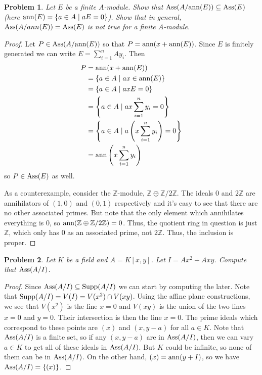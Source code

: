 \documentclass{article}
\newcommand{\ass}{\textup{Ass}}
\newcommand{\supp}{\textup{Supp}}
\newcommand{\ann}{\textup{ann}}
\newtheorem{problem}{Problem}
\begin{document}
\begin{problem}
Let $E$ be a finite $A$-module. Show that $\ass(A/\ann(E)) \subseteq \ass(E)$ (here $\ann(E) = \{a \in A \mid aE = 0\}$). Show that in general, $\ass(A/ann(E)) = \ass(E)$ is not true for a finite $A$-module.
\end{problem}
\begin{proof}
Let $P \in \ass(A/\ann(E))$ so that $P = \ann(x + \ann(E))$. Since $E$ is finitely generated we can write $E = \sum_{i=1}^n Ay_i$. Then
\begin{align*}
P
&= \ann(x + \ann(E))\\
&= \{a \in A \mid ax \in \ann(E)\}\\
&= \{a \in A \mid axE = 0\}\\
&= \left \{a \in A \mid ax\sum_{i=1}^n y_i = 0 \right \}\\
&= \left \{a \in A \mid a \left ( x \sum_{i=1}^n y_i \right ) = 0 \right \}\\
&= \ann \left ( x\sum_{i=1}^n y_i \right )
\end{align*}
so $P \in \ass(E)$ as well.

As a counterexample, consider the $\mathbb{Z}$-module, $\mathbb{Z} \oplus \mathbb{Z}/2\mathbb{Z}$. The ideals $0$ and $2 \mathbb{Z}$ are annihilators of $(1,0)$ and $(0,1)$ respectively and it's easy to see that there are no other associated primes. But note that the only element which annihilates everything is $0$, so $\ann(\mathbb{Z} \oplus \mathbb{Z}/2\mathbb{Z}) = 0$. Thus, the quotient ring in question is just $\mathbb{Z}$, which only has $0$ as an associated prime, not $2 \mathbb{Z}$. Thus, the inclusion is proper.
\end{proof}

\begin{problem}
Let $K$ be a field and $A = K[x,y]$. Let $I = Ax^2 + Axy$. Compute that $\ass(A/I)$.
\end{problem}
\begin{proof}
Since $\ass(A/I) \subseteq \supp(A/I)$ we can start by computing the later. Note that $\supp(A/I) = V(I) = V(x^2) \cap V(xy)$. Using the affine plane constructions, we see that $V(x^2)$ is the line $x = 0$ and $V(xy)$ is the union of the two lines $x = 0$ and $y = 0$. Their intersection is then the line $x = 0$. The prime ideals which correspond to these points are $(x)$ and $(x,y-a)$ for all $a \in K$. Note that $\ass(A/I)$ is a finite set, so if any $(x,y-a)$ are in $\ass(A/I)$, then we can vary $a \in K$ to get all of these ideals in $\ass(A/I)$. But $K$ could be infinite, so none of them can be in $\ass(A/I)$. On the other hand, $(x) = \ann(y + I)$, so we have $\ass(A/I) = \{(x)\}$.
\end{proof}
\end{document}
